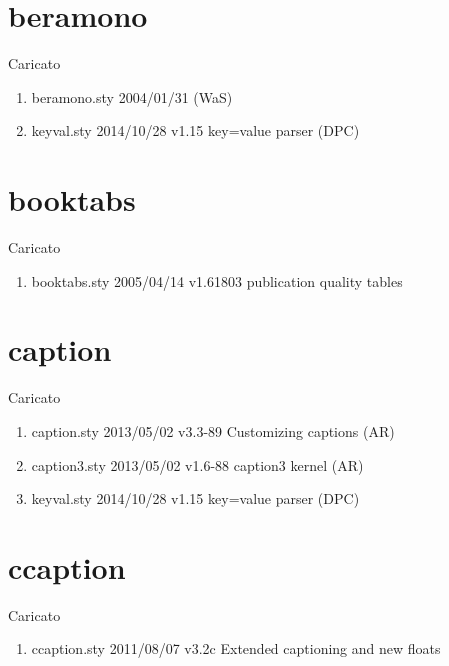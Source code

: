 \section{beramono}

Caricato 
\begin{enumerate}
\item beramono.sty 2004/01/31 (WaS)
\item keyval.sty 2014/10/28 v1.15 key=value parser (DPC)
\end{enumerate}
\section{booktabs}

Caricato 
\begin{enumerate}
\item booktabs.sty 2005/04/14 v1.61803 publication quality tables
\end{enumerate}
\section{caption}

Caricato
\begin{enumerate}
\item 	 caption.sty 2013/05/02 v3.3-89 Customizing captions (AR)
\item caption3.sty 2013/05/02 v1.6-88 caption3 kernel (AR)
\item keyval.sty 2014/10/28 v1.15 key=value parser (DPC)
\end{enumerate}
\section{ccaption}

Caricato
\begin{enumerate}
\item ccaption.sty 2011/08/07 v3.2c Extended captioning and new floats
\end{enumerate}
